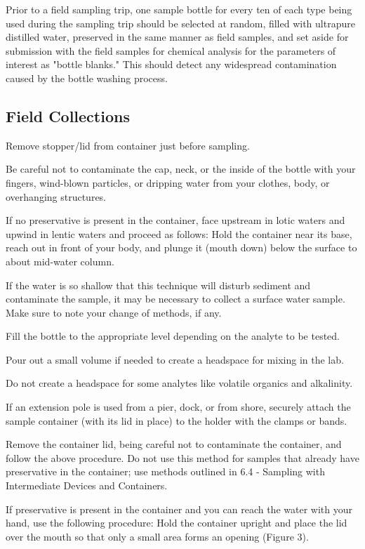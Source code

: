 \documentclass[12pt]{../SOP4_alpha}\usepackage[]{graphicx}\usepackage[]{xcolor}
\begin{document}
\NP Prior to a field sampling trip, one sample bottle for every ten of each type being used during the sampling trip should be selected at random, filled with ultrapure distilled water, preserved in the same manner as field samples, and set aside for submission with the field samples for chemical analysis for the parameters of interest as "bottle blanks." This should detect any widespread contamination caused by the bottle washing process.

\subsection{Field Collections}

\NP Remove stopper/lid from container just before sampling. 

\NP Be careful not to contaminate the cap, neck, or the inside of the bottle with your fingers, wind-blown particles, or dripping water from your clothes, body, or overhanging structures.  

\NP If no preservative is present in the container, face upstream in lotic waters and upwind in lentic waters and proceed as follows:  Hold the container near its base, reach out in front of your body, and plunge it (mouth down) below the surface to about mid-water column. 

\NP If the water is so shallow that this technique will disturb sediment and contaminate the sample, it may be necessary to collect a surface water sample. Make sure to note your change of methods, if any.  

\NP Fill the bottle to the appropriate level depending on the analyte to be tested.  

\NP Pour out a small volume if needed to create a headspace for mixing in the lab. 

\NP Do not create a headspace for some analytes like volatile organics and alkalinity.  

\NP If an extension pole is used from a pier, dock, or from shore, securely attach the sample container (with its lid in place) to the holder with the clamps or bands. 

\NP Remove the container lid, being careful not to contaminate the container, and follow the above procedure. Do not use this method for samples that already have preservative in the container; use methods outlined in 6.4 - Sampling with Intermediate Devices and Containers.  

\NP If preservative is present in the container and you can reach the water with your hand, use the following procedure:  Hold the container upright and place the lid over the mouth so that only a small area forms an opening (Figure 3).
\end{document}
